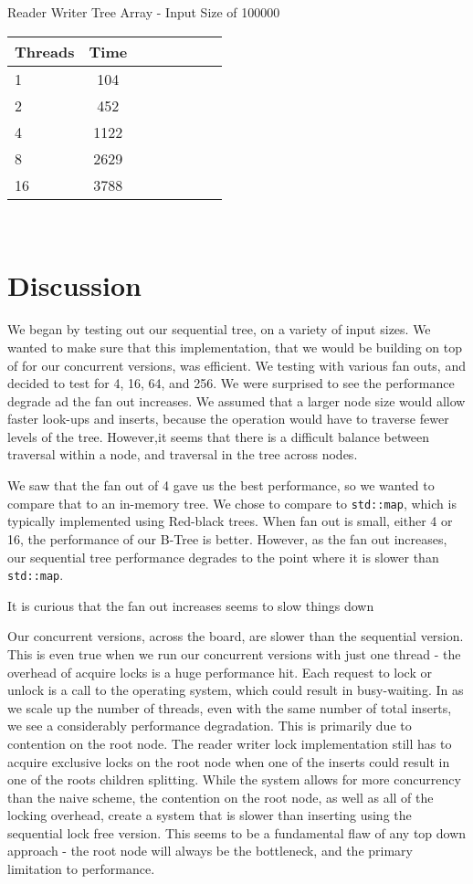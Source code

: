 \documentclass{sig-alternate}
\begin{document}
Reader Writer Tree Array - Input Size of 100000 \\
\begin{tabular}{| l | c | c | c | c | c | c | r}
  \hline
  Threads & Time \\ \hline
  1 & 104 \\
  2 & 452 \\
  4 & 1122 \\
  8 & 2629 \\
  16 & 3788 \\
  \hline
\end{tabular} \\

\section{Discussion}
We began by testing out our sequential tree, on a variety of input sizes.  We wanted to make sure that this implementation, that we would be building on top of for our concurrent versions, was efficient.  We testing with various fan outs, and decided to test for 4, 16, 64, and 256.  We were surprised to see the performance degrade ad the fan out increases.  We assumed that a larger node size would allow faster look-ups and inserts, because the operation would have to traverse fewer levels of the tree.  However,it seems that there is a difficult balance between traversal within a node, and traversal in the tree across nodes.

We saw that the fan out of 4 gave us the best performance, so we wanted to compare that to an in-memory tree.  We chose to compare to \texttt{std::map}, which is typically implemented using Red-black trees.  When fan out is small, either 4 or 16, the performance of our B-Tree is better.  However, as the fan out increases, our sequential tree performance degrades to the point where it is slower than \texttt{std::map}.

It is curious that the fan out increases seems to slow things down

Our concurrent versions, across the board, are slower than the sequential version.  This is even true when we run our concurrent versions with just one thread - the overhead of acquire locks is a huge performance hit.  Each request to lock or unlock is a call to the operating system, which could result in busy-waiting.  In as we scale up the number of threads, even with the same number of total inserts, we see a considerably performance degradation.  This is primarily due to contention on the root node.    The reader writer lock implementation still has to acquire exclusive locks on the root node when one of the inserts could result in one of the roots children splitting.  While the system allows for more concurrency than the naive scheme, the contention on the root node, as well as all of the locking overhead, create a system that is slower than inserting using the sequential lock free version.  This seems to be a fundamental flaw of any top down approach - the root node will always be the bottleneck, and the primary limitation to performance.
\end{document}
